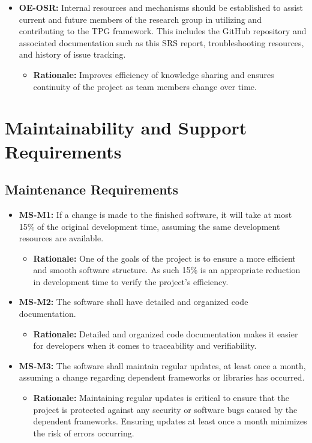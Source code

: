 \documentclass[12pt]{article}
\newcommand{\lips}{\textit{Insert your content here.}}
\begin{document}
\begin{itemize}
\item \textbf{OE-OSR:} Internal resources and mechanisms should be established to assist current and future members of the research group in utilizing and contributing to the TPG framework. This includes the GitHub repository and associated documentation such as this SRS report, troubleshooting resources, and history of issue tracking.
  \begin{itemize}
    \item \textbf{Rationale:} Improves efficiency of knowledge sharing and ensures continuity of the project as team members change over time.
  \end{itemize}
\end{itemize}

\section{Maintainability and Support Requirements}
\subsection{Maintenance Requirements}

\begin{itemize}
  \item \textbf{MS-M1:} If a change is made to the finished software, it will take at most 15\% of the original development time, assuming the same development resources are available.
    \begin{itemize}
      \item \textbf{Rationale:} One of the goals of the project is to ensure a more efficient and smooth software structure. As such 15\% is an appropriate reduction in development time to verify the project’s efficiency. 
    \end{itemize}
  \item \textbf{MS-M2:} The software shall have detailed and organized code documentation.
  \begin{itemize}
    \item \textbf{Rationale:} Detailed and organized code documentation makes it easier for developers when it comes to traceability and verifiability. 
  \end{itemize}
  \item \textbf{MS-M3:} The software shall maintain regular updates, at least once a month, assuming a change regarding dependent frameworks or libraries has occurred. 
  \begin{itemize}
    \item \textbf{Rationale:} Maintaining regular updates is critical to ensure that the project is protected against any security or software bugs caused by the dependent frameworks. Ensuring updates at least once a month minimizes the risk of errors occurring. 
  \end{itemize}
\end{itemize}
\end{document}
